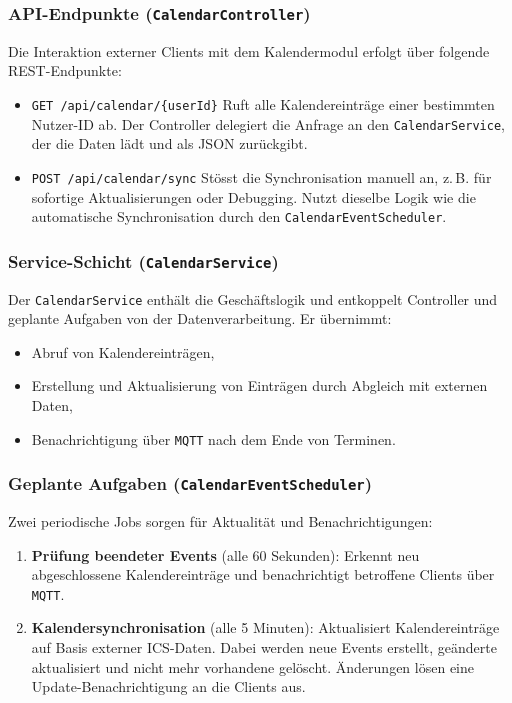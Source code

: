 \documentclass[12pt,a4paper]{report}
\begin{document}
    \subsubsection{API-Endpunkte (\texttt{CalendarController})}
        Die Interaktion externer Clients mit dem Kalendermodul erfolgt über folgende REST-Endpunkte:
        \begin{itemize}
            \item \texttt{GET /api/calendar/\{userId\}}
                Ruft alle Kalendereinträge einer bestimmten Nutzer-ID ab.
                Der Controller delegiert die Anfrage an den \texttt{CalendarService}, der die Daten lädt und als JSON zurückgibt.
            \item \texttt{POST /api/calendar/sync}
                Stösst die Synchronisation manuell an, z.\,B. für sofortige Aktualisierungen oder Debugging.
                Nutzt dieselbe Logik wie die automatische Synchronisation durch den \texttt{CalendarEventScheduler}.
        \end{itemize}

    \subsubsection{Service-Schicht (\texttt{CalendarService})}
        Der \texttt{CalendarService} enthält die Geschäftslogik und entkoppelt Controller und geplante Aufgaben von der Datenverarbeitung.
        Er übernimmt:
        \begin{itemize}
            \item Abruf von Kalendereinträgen,
            \item Erstellung und Aktualisierung von Einträgen durch Abgleich mit externen Daten,
            \item Benachrichtigung über \texttt{MQTT} nach dem Ende von Terminen.
        \end{itemize}

    \subsubsection{Geplante Aufgaben (\texttt{CalendarEventScheduler})}
        Zwei periodische Jobs sorgen für Aktualität und Benachrichtigungen:
        \begin{enumerate}
            \item \textbf{Prüfung beendeter Events} (alle 60 Sekunden):
                Erkennt neu abgeschlossene Kalendereinträge und benachrichtigt betroffene Clients über \texttt{MQTT}.
            \item \textbf{Kalendersynchronisation} (alle 5 Minuten):
                Aktualisiert Kalendereinträge auf Basis externer ICS-Daten.
                Dabei werden neue Events erstellt, geänderte aktualisiert und nicht mehr vorhandene gelöscht.
                Änderungen lösen eine Update-Benachrichtigung an die Clients aus.
        \end{enumerate}
\end{document}
